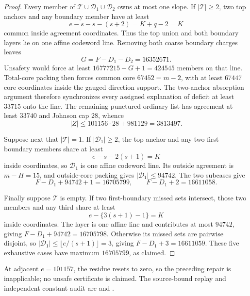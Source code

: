 \documentclass[11pt,a4paper]{amsart}
\numberwithin{equation}{section}
\theoremstyle{remark}
\begin{document}
\begin{proof}
Every member of \(\mathcal T\cup\mathcal D_1\cup\mathcal D_2\)
owns at most one slope.  If \(|\mathcal T|\ge2\), two top anchors and
any boundary member have at least
\[
 e-s-s-(s+2)=K+q-2=K
\]
common inside agreement coordinates.  Thus the top union and both
boundary layers lie on one affine codeword line.  Removing both coarse
boundary charges leaves
\[
 G=F-D_1-D_2=16352671.
\]
Unsafety would force at least \(16777215-G+1=424545\) members on that
line.  Total-core packing then forces common core \(67452=m-2\), with
at least \(67447\) core coordinates inside the gauged direction
support.  The two-anchor absorption argument therefore synchronizes every
assigned explanation of deficit at least \(33715\) onto the line.  The
remaining punctured ordinary list has agreement at least \(33740\) and
Johnson cap \(28\), whence
\[
 |Z|\le101156\cdot28+981129=3813497.
\]

Suppose next that \(|\mathcal T|=1\).  If
\(|\mathcal D_1|\ge2\), the top anchor and any two first-boundary
members share at least
\[
 e-s-2(s+1)=K
\]
inside coordinates, so \(\mathcal D_1\) is one affine codeword line.
Its outside agreement is \(m-H=15\), and outside-core packing gives
\(|\mathcal D_1|\le94742\).  The two subcases give
\[
 F-D_1+94742+1=16705799,\qquad
 F-D_1+2=16611058.
\]

Finally suppose \(\mathcal T\) is empty.  If two first-boundary
missed sets intersect, those two members and any third share at least
\[
 e-\{3(s+1)-1\}=K
\]
inside coordinates.  The layer is one affine line and contributes at
most \(94742\), giving \(F-D_1+94742=16705798\).  Otherwise its
missed sets are pairwise disjoint, so
\(|\mathcal D_1|\le\lfloor e/(s+1)\rfloor=3\), giving
\(F-D_1+3=16611059\).  These five exhaustive cases have maximum
\(16705799\), as claimed.
\end{proof}

\begin{remark}
At adjacent \(e=101157\), the residue resets to zero, so the preceding
repair is inapplicable; no unsafe certificate is claimed.  The source-bound
replay and independent constant audit are
and
.
\end{remark}
\end{document}
